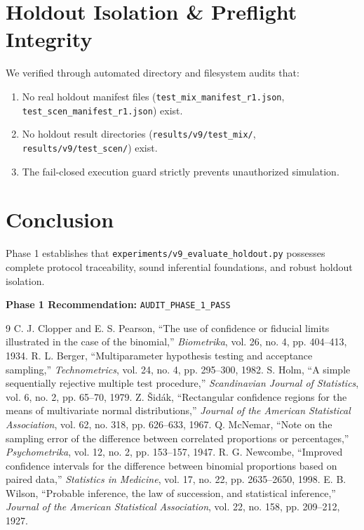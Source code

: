 \documentclass[10pt,a4paper]{article}
\begin{document}
\section{Holdout Isolation \& Preflight Integrity}
We verified through automated directory and filesystem audits that:
\begin{enumerate}
    \item No real holdout manifest files (\texttt{test\_mix\_manifest\_r1.json}, \texttt{test\_scen\_manifest\_r1.json}) exist.
    \item No holdout result directories (\texttt{results/v9/test\_mix/}, \texttt{results/v9/test\_scen/}) exist.
    \item The fail-closed execution guard strictly prevents unauthorized simulation.
\end{enumerate}

\section{Conclusion}
Phase 1 establishes that \texttt{experiments/v9\_evaluate\_holdout.py} possesses complete protocol traceability, sound inferential foundations, and robust holdout isolation.

\noindent \textbf{Phase 1 Recommendation:} \texttt{AUDIT\_PHASE\_1\_PASS}

\begin{thebibliography}{9}
 C. J. Clopper and E. S. Pearson, ``The use of confidence or fiducial limits illustrated in the case of the binomial,'' \textit{Biometrika}, vol. 26, no. 4, pp. 404--413, 1934.
 R. L. Berger, ``Multiparameter hypothesis testing and acceptance sampling,'' \textit{Technometrics}, vol. 24, no. 4, pp. 295--300, 1982.
 S. Holm, ``A simple sequentially rejective multiple test procedure,'' \textit{Scandinavian Journal of Statistics}, vol. 6, no. 2, pp. 65--70, 1979.
 Z. Šidák, ``Rectangular confidence regions for the means of multivariate normal distributions,'' \textit{Journal of the American Statistical Association}, vol. 62, no. 318, pp. 626--633, 1967.
 Q. McNemar, ``Note on the sampling error of the difference between correlated proportions or percentages,'' \textit{Psychometrika}, vol. 12, no. 2, pp. 153--157, 1947.
 R. G. Newcombe, ``Improved confidence intervals for the difference between binomial proportions based on paired data,'' \textit{Statistics in Medicine}, vol. 17, no. 22, pp. 2635--2650, 1998.
 E. B. Wilson, ``Probable inference, the law of succession, and statistical inference,'' \textit{Journal of the American Statistical Association}, vol. 22, no. 158, pp. 209--212, 1927.
\end{thebibliography}
\end{document}
